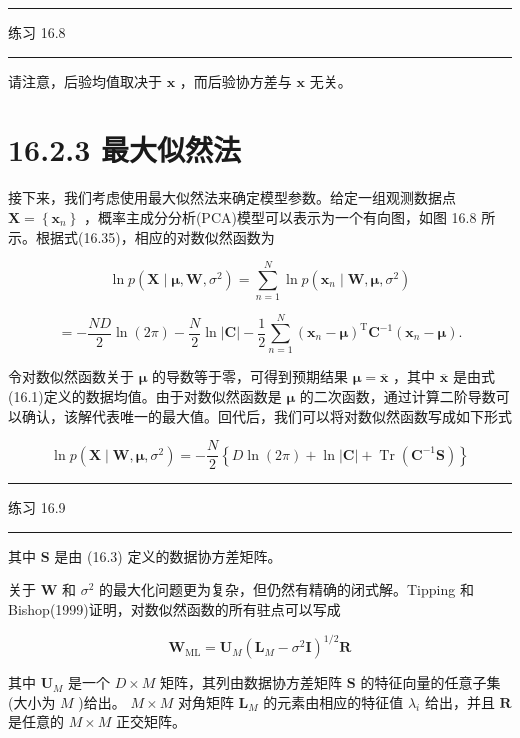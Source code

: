 \documentclass[10pt]{report}
\newcommand{\HRule}{\begin{center}\rule{0.9\linewidth}{0.2mm}\end{center}}
\begin{document}
\HRule

练习 16.8

\HRule

请注意，后验均值取决于 \(\mathbf{x}\) ，而后验协方差与 \(\mathbf{x}\) 无关。

\section*{16.2.3 最大似然法}

接下来，我们考虑使用最大似然法来确定模型参数。给定一组观测数据点 \(\mathbf{X} = \left\{  {\mathbf{x}}_{n}\right\}\) ，概率主成分分析(PCA)模型可以表示为一个有向图，如图 16.8 所示。根据式(16.35)，相应的对数似然函数为

\[
\ln p\left( {\mathbf{X} \mid  \mathbf{\mu },\mathbf{W},{\sigma }^{2}}\right)  = \mathop{\sum }\limits_{{n = 1}}^{N}\ln p\left( {{\mathbf{x}}_{n} \mid  \mathbf{W},\mathbf{\mu },{\sigma }^{2}}\right)
\]

\[
=  - \frac{ND}{2}\ln \left( {2\pi }\right)  - \frac{N}{2}\ln \left| \mathbf{C}\right|  - \frac{1}{2}\mathop{\sum }\limits_{{n = 1}}^{N}{\left( {\mathbf{x}}_{n} - \mathbf{\mu }\right) }^{\mathrm{T}}{\mathbf{C}}^{-1}\left( {{\mathbf{x}}_{n} - \mathbf{\mu }}\right) . \tag{16.44}
\]

令对数似然函数关于 \(\mathbf{\mu }\) 的导数等于零，可得到预期结果 \(\mathbf{\mu } = \overline{\mathbf{x}}\) ，其中 \(\overline{\mathbf{x}}\) 是由式(16.1)定义的数据均值。由于对数似然函数是 \(\mathbf{\mu }\) 的二次函数，通过计算二阶导数可以确认，该解代表唯一的最大值。回代后，我们可以将对数似然函数写成如下形式

\[
\ln p\left( {\mathbf{X} \mid  \mathbf{W},\mathbf{\mu },{\sigma }^{2}}\right)  =  - \frac{N}{2}\left\{  {D\ln \left( {2\pi }\right)  + \ln \left| \mathbf{C}\right|  + \operatorname{Tr}\left( {{\mathbf{C}}^{-1}\mathbf{S}}\right) }\right\}   \tag{16.45}
\]

\HRule

练习 16.9

\HRule

其中 \(\mathbf{S}\) 是由 (16.3) 定义的数据协方差矩阵。

关于 \(\mathbf{W}\) 和 \({\sigma }^{2}\) 的最大化问题更为复杂，但仍然有精确的闭式解。Tipping 和 Bishop(1999)证明，对数似然函数的所有驻点可以写成

\[
{\mathbf{W}}_{\mathrm{{ML}}} = {\mathbf{U}}_{M}{\left( {\mathbf{L}}_{M} - {\sigma }^{2}\mathbf{I}\right) }^{1/2}\mathbf{R} \tag{16.46}
\]

其中 \({\mathbf{U}}_{M}\) 是一个 \(D \times  M\) 矩阵，其列由数据协方差矩阵 \(\mathbf{S}\) 的特征向量的任意子集(大小为 \(M\) )给出。 \(M \times  M\) 对角矩阵 \({\mathbf{L}}_{M}\) 的元素由相应的特征值 \({\lambda }_{i}\) 给出，并且 \(\mathbf{R}\) 是任意的 \(M \times  M\) 正交矩阵。
\end{document}
